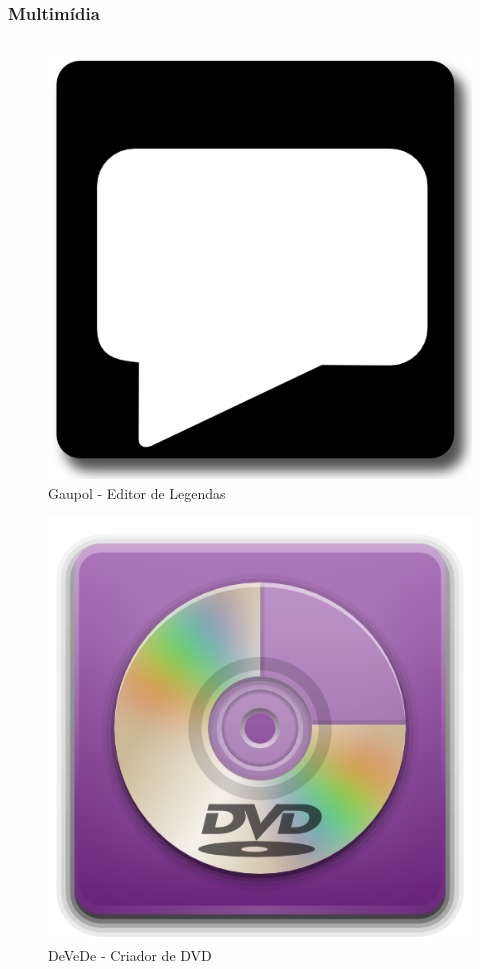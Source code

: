 \begin{frame}\frametitle{Multimídia}

\begin{columns}

	\begin{column}{4cm}
		\begin{figure}
			\includegraphics[scale=0.14]{img/gaupol.png}
			\caption{Gaupol - Editor de Legendas}
		\end{figure}
		
		\begin{figure}
			\includegraphics[scale=0.8]{img/devede.png}
			\caption{DeVeDe - Criador de DVD}
		\end{figure}
	\end{column}


\end{columns}
\end{frame}
